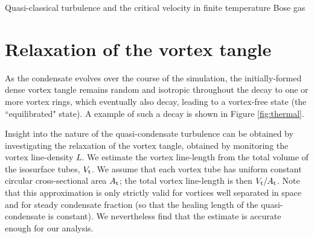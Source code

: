 \begin{chapter}{\label{cha:nonequib}Quasi-classical turbulence and the critical velocity in finite temperature Bose gas}
\section{Relaxation of the vortex tangle}
As the condensate evolves over the course of the simulation, the initially-formed dense vortex tangle remains random and isotropic throughout the decay to one or more vortex rings, which eventually also decay, leading to a vortex-free state (the ``equilibrated" state). A example of such a decay is shown in Figure \ref{fig:thermal}.

Insight into the nature of the quasi-condensate turbulence can be obtained by investigating the relaxation of the vortex tangle, obtained by monitoring the vortex line-density $L$. We estimate the vortex line-length from the total volume of the isosurface tubes, $V_{\rm t}$. We assume that each vortex tube has uniform constant circular cross-sectional area $A_{\rm t}$; the total vortex line-length is then $V_{\rm t}/A_{\rm t}$. Note that this approximation is only strictly valid for vortices well separated in space and for steady condensate fraction (so that the healing length of the quasi-condensate is constant). We nevertheless find that the estimate is accurate enough for our analysis.


\end{chapter}
